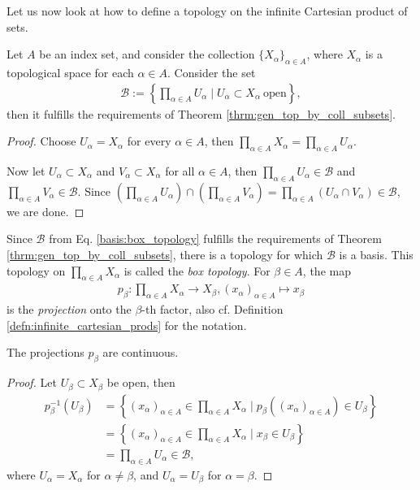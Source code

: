 Let us now look at how to define a topology on the infinite Cartesian product of sets.

\begin{theorem}
	Let $A$ be an index set, and consider the collection $\{X_{\alpha}\}_{\alpha\in A}$, where $X_{\alpha}$ is a topological space for each $\alpha\in A$. Consider the set
	\begin{align}\label{basis:box_topology}
		\mathscr B := \left\{ \prod_{\alpha\in A}U_{\alpha}\mid U_{\alpha}\subset X_{\alpha}\ \text{open} \right\},
	\end{align}
	then it fulfills the requirements of Theorem \ref{thrm:gen_top_by_coll_subsets}.
\end{theorem}

\begin{proof}
	Choose $U_{\alpha} = X_{\alpha}$ for every $\alpha\in A$, then $\prod_{\alpha\in A}X_{\alpha} = \prod_{\alpha\in A}U_{\alpha}$.
	
	Now let $U_{\alpha}\subset X_{\alpha}$ and $V_{\alpha}\subset X_{\alpha}$ for all $\alpha\in A$, then $\prod_{\alpha\in A}U_{\alpha}\in \mathscr B$ and $\prod_{\alpha\in A}V_{\alpha}\in \mathscr B$. Since $\left(\prod_{\alpha\in A}U_{\alpha}\right) \cap \left(\prod_{\alpha\in A}V_{\alpha}\right) = \prod_{\alpha\in A}\left(U_{\alpha}\cap V_{\alpha}\right)\in\mathscr B$, we are done.
\end{proof}

\begin{defn}
	Since $\mathscr B$ from Eq. \eqref{basis:box_topology} fulfills the requirements of Theorem \ref{thrm:gen_top_by_coll_subsets}, there is a topology for which $\mathscr B$ is a basis. This topology on $\prod_{\alpha\in A}X_{\alpha}$ is called the \textit{box topology}. For $\beta\in A$, the map 
	\begin{align}\label{eq:projection_box_topology}
		p_{\beta}: \prod_{\alpha\in A}X_{\alpha}\to X_{\beta}, (x_\alpha)_{\alpha\in A}\mapsto x_{\beta}
	\end{align} is the \textit{projection} onto the $\beta$-th factor, also cf. Definition \ref{defn:infinite_cartesian_prods} for the notation.
\end{defn}

\begin{remark}
	The projections $p_{\beta}$ are continuous.
\end{remark}

\begin{proof}
	Let $U_{\beta}\subset X_{\beta}$ be open, then
	\begin{align*}
		p_{\beta}^{-1}(U_\beta) &= \left\{ (x_{\alpha})_{\alpha\in A}\in \prod_{\alpha\in A}X_{\alpha}\mid p_{\beta}\left((x_{\alpha})_{\alpha\in A}\right)\in U_{\beta} \right\} 
		\\ &= \left\{ (x_{\alpha})_{\alpha\in A}\in \prod_{\alpha\in A}X_{\alpha}\mid x_{\beta}\in U_{\beta} \right\}
		\\ &= \prod_{\alpha\in A}U_{\alpha}\in \mathscr B,
	\end{align*}
	where $U_{\alpha} = X_{\alpha}$ for $\alpha\ne\beta$, and $U_{\alpha} = U_{\beta}$ for $\alpha= \beta$.
\end{proof}

